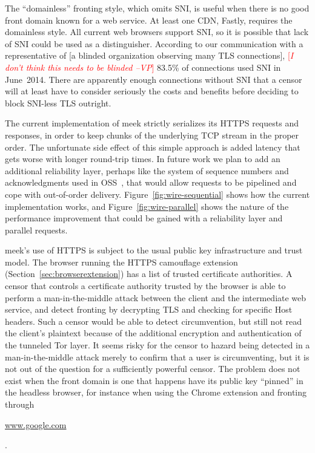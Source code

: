 \documentclass{sig-alternate}
\newcommand{\meek}{meek\xspace}
\def\urll#1{\begin{NoHyper}\url{#1}\end{NoHyper}}
\newcommand{\note}[1]{{\textcolor{red}{[\textit{#1}]}}}
\newcommand{\vp}[1]{\note{#1 --VP}}
\begin{document}
The ``domainless'' fronting style, which omits SNI,
is useful when there is no good front domain known for a web service.
At least one CDN, Fastly, requires the domainless style.
All current web browsers support SNI,
so it is possible that lack of SNI could be used as a distinguisher.
According to our communication with
a representative of
[a blinded organization observing many TLS connections],
\vp{I don't think this needs to be blinded}
83.5\% of connections used SNI in June~2014.
There are apparently enough connections without SNI
that a censor will at least have to consider seriously
the costs and benefits before deciding to block SNI-less TLS outright.

The current implementation of \meek strictly serializes
its HTTPS requests and responses,
in order to keep chunks of the underlying TCP stream
in the proper order.
The unfortunate side effect of this simple approach
is added latency that gets worse with longer round-trip times.
In future work we plan to add an additional reliability layer,
perhaps like the system of sequence numbers and acknowledgments used in OSS~\cite{oss},
that would allow requests to be pipelined
and cope with out-of-order delivery.
Figure~\ref{fig:wire-sequential} shows how the current implementation works,
and Figure~\ref{fig:wire-parallel} shows the nature of the performance
improvement that could be gained with a reliability layer
and parallel requests.

\meek's use of HTTPS is subject to the usual public key infrastructure
and trust model.
The browser running the HTTPS camouflage extension (Section~\ref{sec:browserextension})
has a list of trusted certificate authorities.
A censor that controls a certificate authority trusted by the browser
is able to perform a man-in-the-middle attack
between the client and the intermediate web service,
and detect fronting by decrypting TLS and checking for specific Host headers.
Such a censor would be able to detect circumvention,
but still not read the client's plaintext because of the
additional encryption and authentication of the tunneled Tor layer.
It seems risky for the censor to hazard being detected in
a man-in-the-middle attack merely to confirm that a user is circumventing,
but it is not out of the question for a sufficiently powerful censor.
The problem does not exist when the front domain is one
that happens have its public key ``pinned'' in the headless browser,
for instance when using the Chrome extension and fronting through
\urll{www.google.com}.
\end{document}
